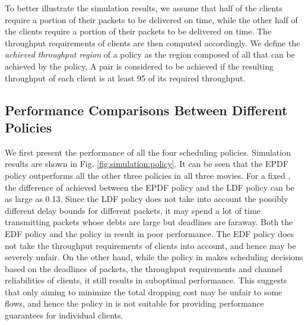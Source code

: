 \documentclass[10pt,nocopyrightspace]{sigplan-proc-varsize-1in}
\begin{document}
To better illustrate the simulation results, we assume that half of the clients require a portion  of their packets to be delivered on time, while the other half of the clients require a portion  of their packets to be delivered on time. The throughput requirements of clients are then computed accordingly. We define the \emph{achieved throughput region} of a policy as the region composed of all  that can be achieved by the policy. A pair  is considered to be achieved if the resulting throughput of each client is at least 95 of its required throughput.


\subsection{Performance Comparisons Between Different Policies}	\label{section:simulation:policy}

\begin{figure*}
\hspace{0.01\linewidth} 
\hspace{0.01\linewidth} 
\caption{Achieved throughput regions under different policies}\label{fig:simulation:policy}
\end{figure*}

We first present the performance of all the four scheduling policies. Simulation results are shown in Fig. \ref{fig:simulation:policy}. It can be seen that the EPDF policy outperforms all the other three policies in all three movies. For a fixed , the difference of achieved  between the EPDF policy and the LDF policy can be as large as 0.13. Since the LDF policy does not take into account the possibly different delay bounds for different packets, it may spend a lot of time transmitting packets whose debts are large but deadlines are faraway. Both the EDF policy and the policy in \cite{AD07} result in poor performance. The EDF policy does not take the throughput requirements of clients into account, and hence may be severely unfair. On the other hand, while the policy in \cite{AD07} makes scheduling decisions based on the deadlines of packets, the throughput requirements and channel reliabilities of clients, it still results in suboptimal performance. This suggests that only aiming to minimize the total dropping cost may be unfair to some flows, and hence the policy in \cite{AD07} is not suitable for providing performance guarantees for individual clients. 
\end{document}

